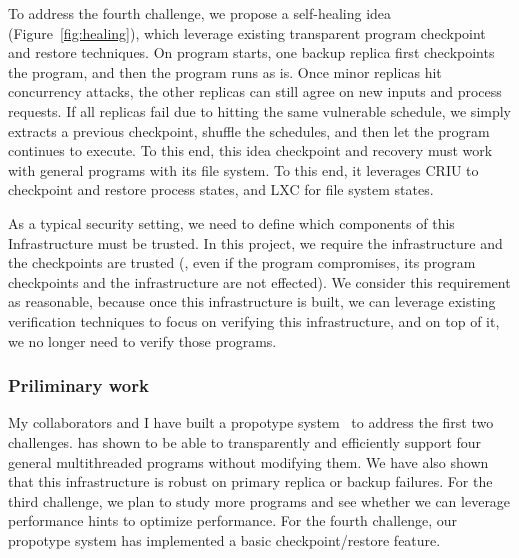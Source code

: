 To address the fourth challenge, we propose a self-healing idea 
(Figure~\ref{fig:healing}), which leverage existing transparent program 
checkpoint and restore techniques. On program starts, one backup replica first 
checkpoints the program, and then the program runs as is. Once minor replicas 
hit concurrency attacks, the other replicas can still agree on new inputs and 
process requests. If all replicas fail due to hitting the same vulnerable 
schedule, we simply extracts a previous checkpoint, shuffle the schedules, and 
then let the program continues to execute. To this end, this idea checkpoint 
and recovery must work with general programs with its file system. To this end, 
it leverages CRIU to checkpoint and restore process states, and LXC for file 
system states.

As a typical security setting, we need to define which components of 
this Infrastructure must be trusted. In this project, we require the 
infrastructure and the checkpoints are trusted (\ie, even if the program 
compromises, its program checkpoints and the infrastructure are not effected). 
We consider this requirement as reasonable, because once this infrastructure is 
built, we can leverage existing verification techniques to focus on verifying 
this infrastructure, and on top of it, we no longer need to verify those 
programs.





\subsubsection{Priliminary work} \label{sec:defense-result}

My collaborators and I have built a propotype system~\cite{crane:sosp15} to 
address the first two challenges. \crane has shown to be able to transparently 
and efficiently support four general multithreaded programs without modifying 
them. We have also shown that this infrastructure is robust on primary replica 
or backup failures. For the third challenge, we plan to study more 
programs and see whether we can leverage performance hints to optimize 
performance. For the fourth challenge, our propotype system \crane has 
implemented a basic checkpoint/restore feature.




